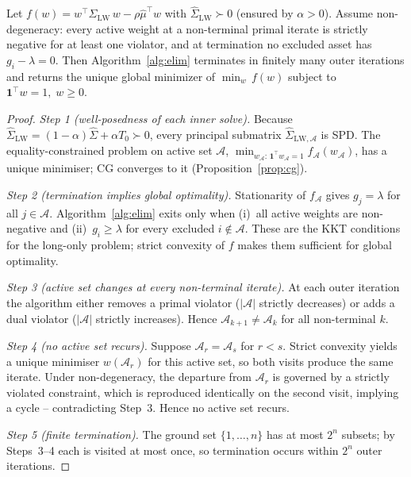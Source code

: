 \begin{theorem}\label{thm:termination}
Let $f(w) = w^\top \hat\Sigma_{\mathrm{LW}}\,w - \rho\hat\mu^\top w$ with
$\hat\Sigma_{\mathrm{LW}} \succ 0$ (ensured by $\alpha > 0$).
Assume non-degeneracy: every active weight at a non-terminal primal iterate is
strictly negative for at least one violator, and at termination no excluded asset has
$g_i - \lambda = 0$.
Then Algorithm~\ref{alg:elim} terminates in finitely many outer iterations and
returns the unique global minimizer of
$\min_{w}\,f(w)$ subject to $\mathbf{1}^\top w = 1,\;w \geq 0$.
\end{theorem}

\begin{proof}
\emph{Step 1 (well-posedness of each inner solve).}
Because $\hat\Sigma_{\mathrm{LW}} = (1-\alpha)\hat\Sigma + \alpha T_0 \succ 0$,
every principal submatrix $\hat\Sigma_{\mathrm{LW},\mathcal{A}}$ is SPD.
The equality-constrained problem on active set $\mathcal{A}$,
$\min_{w_\mathcal{A}:\,\mathbf{1}^\top w_\mathcal{A}=1} f_\mathcal{A}(w_\mathcal{A})$,
has a unique minimiser; CG converges to it (Proposition~\ref{prop:cg}).

\emph{Step 2 (termination implies global optimality).}
Stationarity of $f_\mathcal{A}$ gives $g_j = \lambda$ for all $j\in\mathcal{A}$.
Algorithm~\ref{alg:elim} exits only when (i)~all active weights are non-negative
and (ii)~$g_i \geq \lambda$ for every excluded $i \notin \mathcal{A}$.
These are the KKT conditions for the long-only problem; strict convexity of $f$
makes them sufficient for global optimality.

\emph{Step 3 (active set changes at every non-terminal iterate).}
At each outer iteration the algorithm either removes a primal violator
($|\mathcal{A}|$ strictly decreases) or adds a dual violator ($|\mathcal{A}|$
strictly increases). Hence $\mathcal{A}_{k+1} \neq \mathcal{A}_k$ for all
non-terminal $k$.

\emph{Step 4 (no active set recurs).}
Suppose $\mathcal{A}_r = \mathcal{A}_s$ for $r < s$.
Strict convexity yields a unique minimiser $w(\mathcal{A}_r)$ for this active set,
so both visits produce the same iterate.
Under non-degeneracy, the departure from $\mathcal{A}_r$ is governed by a
strictly violated constraint, which is reproduced identically on the second visit,
implying a cycle -- contradicting Step~3.
Hence no active set recurs.

\emph{Step 5 (finite termination).}
The ground set $\{1,\ldots,n\}$ has at most $2^n$ subsets; by Steps~3--4 each is
visited at most once, so termination occurs within $2^n$ outer iterations.
\end{proof}

